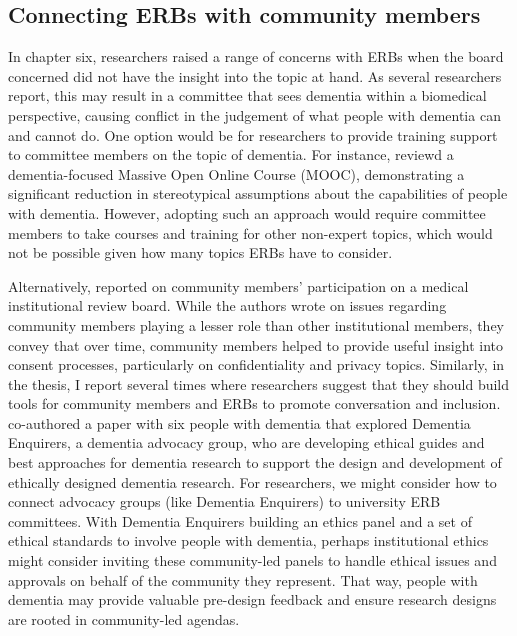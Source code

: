 \subsection{Connecting ERBs with community members}
\label{ERBs-Community-Members}
In chapter six, researchers raised a range of concerns with ERBs when the board concerned did not have the insight into the topic at hand. As several researchers report, this may result in a committee that sees dementia within a biomedical perspective, causing conflict in the judgement of what people with dementia can and cannot do. One option would be for researchers to provide training support to committee members on the topic of dementia. For instance, \cite{goldberg2015relationship} reviewd a dementia-focused Massive Open Online Course (MOOC), demonstrating a significant reduction in stereotypical assumptions about the capabilities of people with dementia. However, adopting such an approach would require committee members to take courses and training for other non-expert topics, which would not be possible given how many topics ERBs have to consider. 

Alternatively, \cite{lidz2012participation} reported on community members' participation on a medical institutional review board. While the authors wrote on issues regarding community members playing a lesser role than other institutional members, they convey that over time, community members helped to provide useful insight into consent processes, particularly on confidentiality and privacy topics. Similarly, in the thesis, I report several times where researchers suggest that they should build tools for community members and ERBs to promote conversation and inclusion. \cite{davies2021dementia} co-authored a paper with six people with dementia that explored Dementia Enquirers, a dementia advocacy group, who are developing ethical guides and best approaches for dementia research to support the design and development of ethically designed dementia research. For researchers, we might consider how to connect advocacy groups (like Dementia Enquirers) to university ERB committees. With Dementia Enquirers building an ethics panel and a set of ethical standards to involve people with dementia, perhaps institutional ethics might consider inviting these community-led panels to handle ethical issues and approvals on behalf of the community they represent. That way, people with dementia may provide valuable pre-design feedback and ensure research designs are rooted in community-led agendas. 

